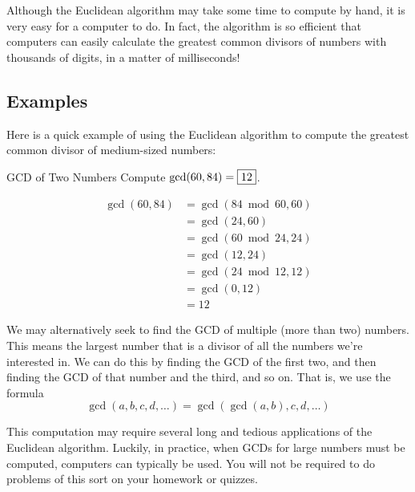 \documentclass[a4paper,10pt]{report}
\begin{document}
Although the Euclidean algorithm may take some time to compute by hand, it is
very easy for a computer to do. In fact, the algorithm is so efficient that
computers can easily calculate the greatest common divisors of numbers with
thousands of digits, in a matter of milliseconds!

\subsection{Examples}

Here is a quick example of using the Euclidean algorithm to compute the
greatest common divisor of medium-sized numbers:

\begin{problem}{GCD of Two Numbers}
 Compute $\gcd(60, 84) = \Ans{12}$.

 \begin{solution}
  \begin{align*}
   \gcd(60, 84)
   &= \gcd(84 \bmod 60, 60) \\
   &= \gcd(24, 60) \\
   &= \gcd(60 \bmod 24, 24) \\
   &= \gcd(12, 24) \\
   &= \gcd(24 \bmod 12, 12) \\
   &= \gcd(0, 12) \\
   &= 12
  \end{align*}
 \end{solution}
\end{problem}

We may alternatively seek to find the GCD of multiple (more than two) numbers.
This means the largest number that is a divisor of all the numbers we're
interested in. We can do this by finding the GCD of the first two, and then
finding the GCD of that number and the third, and so on. That is, we use the
formula \[
 \gcd(a, b, c, d, \dots) = \gcd(\gcd(a, b), c, d, \dots)
\]

This computation may require several long and tedious applications of the
Euclidean algorithm. Luckily, in practice, when GCDs for large numbers must be
computed, computers can typically be used. You will not be required to do
problems of this sort on your homework or quizzes.
\end{document}
